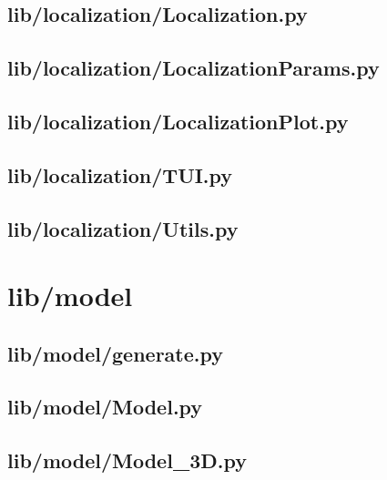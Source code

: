\subsection*{lib/localization/Localization.py}
\label{ap:Localization}

\subsection*{lib/localization/LocalizationParams.py}
\label{ap:LocalizationParams}

\subsection*{lib/localization/LocalizationPlot.py}
\label{ap:LocalizationPlot}

\subsection*{lib/localization/TUI.py}
\label{ap:TUI}

\subsection*{lib/localization/Utils.py}
\label{ap:Utils}
\section{lib/model}

\subsection*{lib/model/generate.py}
\label{ap:generate}

\subsection*{lib/model/Model.py}
\label{ap:Model}

\subsection*{lib/model/Model\_3D.py}
\label{ap:Model_3D}

